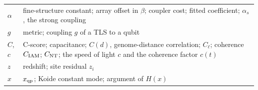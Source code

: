 {\begin{longtable}{@{}>{\raggedright\arraybackslash}p{}>{\raggedright\arraybackslash}p{}@{}}
$\alpha$ & fine-structure constant; array offset in $\beta$; coupler cost; fitted coefficient; $\alpha_s$, the strong coupling\\\iamrowrule
$g$ & metric; coupling $g$ of a TLS to a qubit\\\iamrowrule
$C$, $c$ & C-score; capacitance; $C(d)$, genome-distance correlation; $C_\ell$; coherence $C_{\rm IAM}$; $C_{\rm NT}$; the speed of light $c$ and the coherence factor $c(t)$\\\iamrowrule
$z$ & redshift; site residual $z_i$\\\iamrowrule
$x$ & $x_{\mathrm{qp}}$; Koide constant mode; argument of $H(x)$\\
\bottomrule\end{longtable}}
